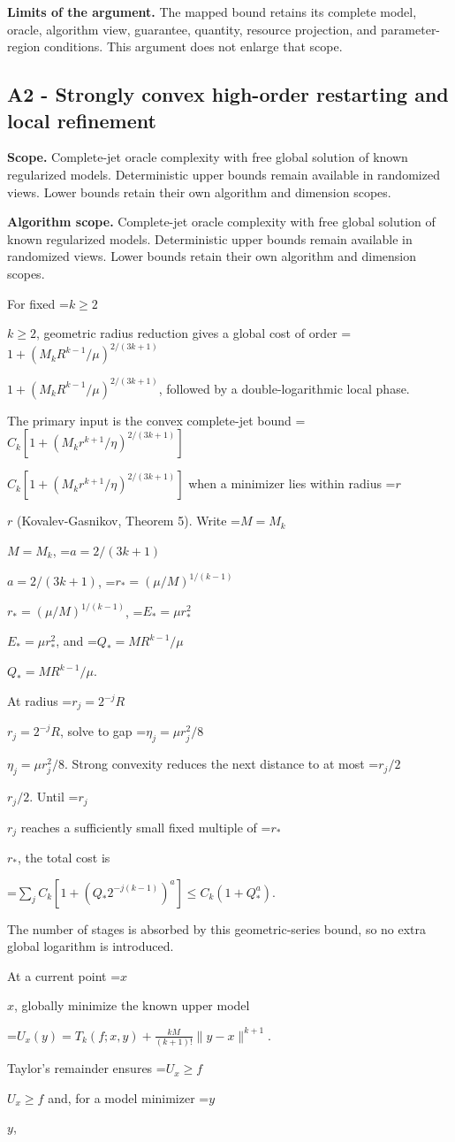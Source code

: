 \documentclass[10pt,a4paper]{article}
\newcommand{\AtlasMath}[1]{\par\begingroup\centering\setbox0=\hbox{$\displaystyle #1$}\ifdim\wd0>1.4\linewidth\typeout{ATLAS WIDE FORMULA: \the\wd0}\fi\ifdim\wd0>\linewidth\resizebox{\linewidth}{!}{\box0}\else\box0\fi\par\endgroup}
\newcommand{\AtlasInlineMath}[1]{\begingroup\setbox0=\hbox{$#1$}\ifdim\wd0>.4\linewidth\endgroup\AtlasMath{#1}\else\endgroup$#1$\fi}
\begin{document}
\textbf{Limits of the argument.} The mapped bound retains its complete model, oracle, algorithm view, guarantee, quantity, resource projection, and parameter-region conditions. This argument does not enlarge that scope.

\subsection{A2 - Strongly convex high-order restarting and local refinement}
\textbf{Scope.} Complete-jet oracle complexity with free global solution of known regularized models. Deterministic upper bounds remain available in randomized views. Lower bounds retain their own algorithm and dimension scopes.

\textbf{Algorithm scope.} Complete-jet oracle complexity with free global solution of known regularized models. Deterministic upper bounds remain available in randomized views. Lower bounds retain their own algorithm and dimension scopes.

For fixed \AtlasInlineMath{k\ge2}, geometric radius reduction gives a global cost of order \AtlasInlineMath{1+(M_kR^{k-1}/\mu)^{2/(3k+1)}}, followed by a double-logarithmic local phase.

The primary input is the convex complete-jet bound \AtlasInlineMath{C_k[1+(M_kr^{k+1}/\eta)^{2/(3k+1)}]} when a minimizer lies within radius \AtlasInlineMath{r} (Kovalev-Gasnikov, Theorem 5). Write \AtlasInlineMath{M=M_k}, \AtlasInlineMath{a=2/(3k+1)}, \AtlasInlineMath{r_*=(\mu/M)^{1/(k-1)}}, \AtlasInlineMath{E_* =\mu r_*^2}, and \AtlasInlineMath{Q_*=MR^{k-1}/\mu}.

At radius \AtlasInlineMath{r_j=2^{-j}R}, solve to gap \AtlasInlineMath{\eta_j=\mu r_j^2/8}. Strong convexity reduces the next distance to at most \AtlasInlineMath{r_j/2}. Until \AtlasInlineMath{r_j} reaches a sufficiently small fixed multiple of \AtlasInlineMath{r_*}, the total cost is

\AtlasMath{\sum_j C_k[1+(Q_*2^{-j(k-1)})^a]\le C_k(1+Q_*^a).}

The number of stages is absorbed by this geometric-series bound, so no extra global logarithm is introduced.

At a current point \AtlasInlineMath{x}, globally minimize the known upper model

\AtlasMath{U_x(y)=T_k(f;x,y)+\frac{kM}{(k+1)!}\|y-x\|^{k+1}.}

Taylor's remainder ensures \AtlasInlineMath{U_x\ge f} and, for a model minimizer \AtlasInlineMath{y},
\end{document}
